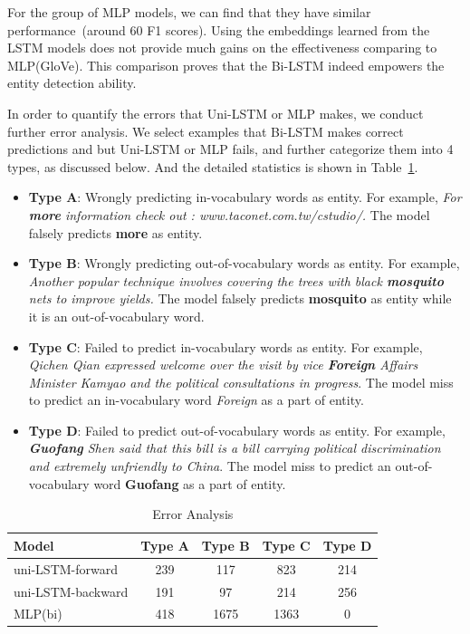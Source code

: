 \documentclass{article}
\begin{document}
For the group of MLP models, we can find that they have similar performance~(around 60 F1 scores). Using the embeddings learned from the LSTM models does not provide much gains on the effectiveness comparing to MLP(GloVe). 
This comparison proves that the Bi-LSTM indeed empowers the entity detection ability. 

In order to quantify the errors that Uni-LSTM or MLP makes, we conduct further error analysis. We select examples that Bi-LSTM makes correct predictions and but Uni-LSTM or MLP fails, and further categorize them into 4 types, as discussed below.
And the detailed statistics is shown in Table~\ref{res:ner_error}. 

\begin{itemize}
	\item \textbf{Type A}: Wrongly predicting in-vocabulary words as entity. For example,\textit{ For \textbf{more} information check out : www.taconet.com.tw/cstudio/.} The model falsely predicts \textbf{more} as entity.
	\item \textbf{Type B}: Wrongly predicting out-of-vocabulary words as entity. For example, \textit{Another popular technique involves covering the trees with black \textbf{mosquito} nets to improve yields.} The model falsely predicts \textbf{mosquito} as entity while it is an out-of-vocabulary word.
	\item \textbf{Type C}: Failed to predict in-vocabulary words as entity. For example, \textit{Qichen Qian expressed welcome over the visit by vice \textbf{Foreign} Affairs Minister Kamyao and the political consultations in progress}. The model miss to predict an in-vocabulary word \textit{Foreign} as a part of entity.
	\item \textbf{Type D}: Failed to predict out-of-vocabulary words as entity. For example, \textit{\textbf{Guofang} Shen said that this bill is a bill carrying political discrimination and extremely unfriendly to China}. The model miss to predict an out-of-vocabulary word \textbf{Guofang} as a part of entity.
\end{itemize}

\begin{table}[t]
	\centering
	\begin{tabular}{l@{\qquad}cccc}
		\toprule
		\textbf{Model}         & Type A & Type B & Type C & Type D \\ \midrule
		uni-LSTM-forward &  239  & 117 & 823 & 214 \\
		uni-LSTM-backward & 191 & 97 & 214 & 256  \\
		MLP(bi) & 418 & 1675 & 1363 & 0  \\ 
		\bottomrule
	\end{tabular}
	\vspace{3mm}
	\caption{Error Analysis }
	\label{res:ner_error}
\end{table}
\end{document}
